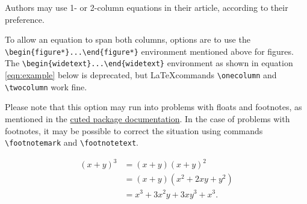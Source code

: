 \documentclass[letterpaper,9pt,twocolumn,twoside,]{pinp}
\begin{document}
Authors may use 1- or 2-column equations in their article, according to
their preference.

To allow an equation to span both columns, options are to use the
\texttt{\textbackslash{}begin\{figure*\}...\textbackslash{}end\{figure*\}}
environment mentioned above for figures. The
\texttt{\textbackslash{}begin\{widetext\}...\textbackslash{}end\{widetext\}}
environment as shown in equation \ref{eqn:example} below is deprecated,
but \LaTeX commands \texttt{\textbackslash{}onecolumn} and
\texttt{\textbackslash{}twocolumn} work fine.

Please note that this option may run into problems with floats and
footnotes, as mentioned in the \href{http://texdoc.net/pkg/cuted}{cuted
package documentation}. In the case of problems with footnotes, it may
be possible to correct the situation using commands
\texttt{\textbackslash{}footnotemark} and
\texttt{\textbackslash{}footnotetext}.

\begin{equation}
  \begin{aligned}
(x+y)^3&=(x+y)(x+y)^2\\
       &=(x+y)(x^2+2xy+y^2) \\
       &=x^3+3x^2y+3xy^3+x^3. 
       \label{eqn:example} 
  \end{aligned}
\end{equation}

\showacknow




\end{document}
